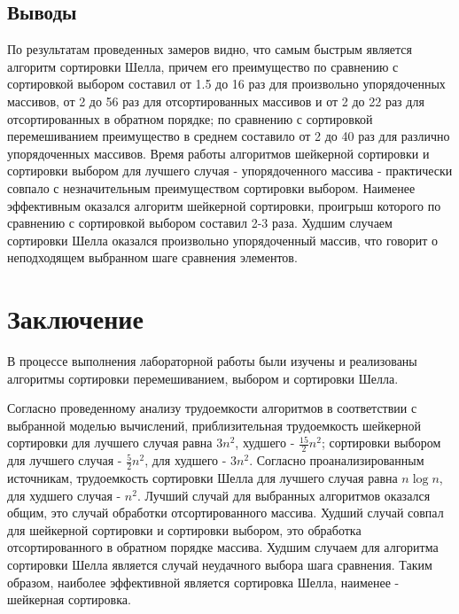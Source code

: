 \documentclass[a4paper,oneside,14pt]{extreport}
\begin{document}
\section{Выводы}
По результатам проведенных замеров видно, что самым быстрым является алгоритм сортировки Шелла, причем его преимущество по сравнению с сортировкой выбором составил от 1.5 до 16 раз для произвольно упорядоченных массивов, от 2 до 56 раз для отсортированных массивов и от 2 до 22 раз для отсортированных в обратном порядке; по сравнению с сортировкой перемешиванием преимущество в среднем составило от 2 до 40 раз для различно упорядоченных массивов. Время работы алгоритмов шейкерной сортировки и сортировки выбором для лучшего случая - упорядоченного массива - практически совпало с незначительным преимуществом сортировки выбором. Наименее эффективным оказался алгоритм шейкерной сортировки, проигрыш которого по сравнению с сортировкой выбором составил 2-3 раза. Худшим случаем сортировки Шелла оказался произвольно упорядоченный массив, что говорит о неподходящем выбранном шаге сравнения элементов. 
\newpage

\chapter*{Заключение}
В процессе выполнения лабораторной работы были изучены и реализованы алгоритмы сортировки перемешиванием, выбором и сортировки Шелла.

Согласно проведенному анализу трудоемкости алгоритмов в соответствии с выбранной моделью вычислений, приблизительная трудоемкость шейкерной сортировки для лучшего случая равна $3n^2$, худшего - $\frac{15}{2}n^2$; сортировки выбором для лучшего случая - $\frac{5}{2}n^2$, для худшего - $3n^2$. Согласно проанализированным источникам, трудоемкость сортировки Шелла для лучшего случая равна $n \log n$, для худшего случая - $n^2$. Лучший случай для выбранных алгоритмов оказался общим, это случай обработки отсортированного массива. Худший случай совпал для шейкерной сортировки и сортировки выбором, это обработка отсортированного в обратном порядке массива. Худшим случаем для алгоритма сортировки Шелла является случай неудачного выбора шага сравнения. Таким образом, наиболее эффективной является сортировка Шелла, наименее - шейкерная сортировка.
\end{document}
